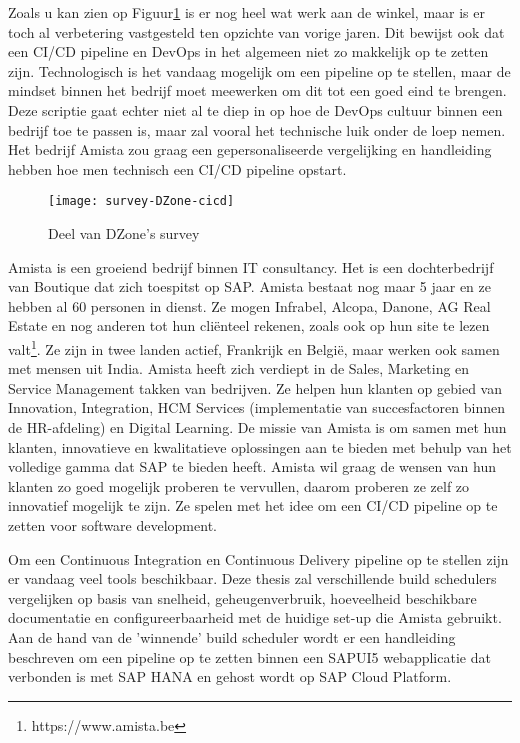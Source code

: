 Zoals u kan zien op Figuur\ref{img-survey-cicd} is er nog heel wat werk aan de winkel, maar is er toch al verbetering vastgesteld ten opzichte van vorige jaren. Dit bewijst ook dat een CI/CD pipeline en DevOps in het algemeen niet zo makkelijk op te zetten zijn. Technologisch is het vandaag mogelijk om een pipeline op te stellen, maar de mindset binnen het bedrijf moet meewerken om dit tot een goed eind te brengen.
Deze scriptie gaat echter niet al te diep in op hoe de DevOps cultuur binnen een bedrijf toe te passen is, maar zal vooral het technische luik onder de loep nemen. Het bedrijf Amista zou graag een gepersonaliseerde vergelijking en handleiding hebben hoe men technisch een CI/CD pipeline opstart.

\begin{figure}	
    \texttt{[image: survey-DZone-cicd]}
    \caption{Deel van DZone's survey ~\autocite{Baker2019}} \label{img-survey-cicd}
\end{figure}

Amista is een groeiend bedrijf binnen IT consultancy. Het is een dochterbedrijf van Boutique dat zich toespitst op SAP. Amista bestaat nog maar 5 jaar en ze hebben al 60 personen in dienst. Ze mogen Infrabel, Alcopa, Danone, AG Real Estate en nog anderen tot hun cliënteel rekenen, zoals ook op hun site te lezen valt\footnote{https://www.amista.be}. %
Ze zijn in twee landen actief, Frankrijk en België, maar werken ook samen met mensen uit India.
Amista heeft zich verdiept in de Sales, Marketing en Service Management takken van bedrijven. Ze helpen hun klanten op gebied van Innovation, Integration, HCM Services (implementatie van succesfactoren binnen de HR-afdeling) en Digital Learning.
De missie van Amista is om samen met hun klanten, innovatieve en kwalitatieve oplossingen aan te bieden met behulp van het volledige gamma dat SAP te bieden heeft.
Amista wil graag de wensen van hun klanten zo goed mogelijk proberen te vervullen, daarom proberen ze zelf zo innovatief mogelijk te zijn. Ze spelen met het idee om een CI/CD pipeline op te zetten voor software development.

Om een Continuous Integration en Continuous Delivery pipeline op te stellen zijn er vandaag veel tools beschikbaar.
Deze thesis zal verschillende build schedulers vergelijken op basis van snelheid, geheugenverbruik, hoeveelheid beschikbare documentatie en configureerbaarheid met de huidige set-up die Amista gebruikt.
Aan de hand van de 'winnende' build scheduler wordt er een handleiding beschreven om een pipeline op te zetten binnen een SAPUI5 webapplicatie dat verbonden is met SAP HANA en gehost wordt op SAP Cloud Platform.

